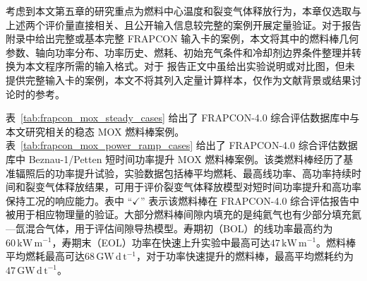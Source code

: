 考虑到本文第五章的研究重点为燃料中心温度和裂变气体释放行为，本章仅选取与上述两个评价量直接相关、且公开输入信息较完整的案例开展定量验证。对于报告附录中给出完整或基本完整 FRAPCON 输入卡的案例，本文将其中的燃料棒几何参数、轴向功率分布、功率历史、燃耗、初始充气条件和冷却剂边界条件整理并转换为本文程序所需的输入格式。对于 报告正文中虽给出实验说明或对比图，但未提供完整输入卡的案例，本文不将其列入定量计算样本，仅作为文献背景或结果讨论时的参考。

表~\ref{tab:frapcon_mox_steady_cases} 给出了 FRAPCON-4.0 综合评估数据库中与本文研究相关的稳态 MOX 燃料棒案例。表~\ref{tab:frapcon_mox_power_ramp_cases} 给出了 FRAPCON-4.0 综合评估数据库中 Beznau-1/Petten 短时间功率提升 MOX 燃料棒案例\cite{ML16118A434}。该类燃料棒经历了基准辐照后的功率提升试验，实验数据包括棒平均燃耗、最高线功率、高功率持续时间和裂变气体释放结果，可用于评价裂变气体释放模型对短时间功率提升和高功率保持工况的响应能力。表中 ``$\checkmark$'' 表示该燃料棒在 FRAPCON-4.0 综合评估报告中被用于相应物理量的验证。大部分燃料棒间隙内填充的是纯氦气也有少部分填充氦—氙混合气体，用于评估间隙导热模型。寿期初（BOL）的线功率最高约为$60\,\mathrm{kW\,m^{-1}}$，寿期末（EOL）功率在快速上升实验中最高可达$47\,\mathrm{kW\,m^{-1}}$。燃料棒平均燃耗最高可达$68\,\mathrm{GW\,d\,t^{-1}}$，对于功率快速提升的燃料棒，最高平均燃耗约为$47\,\mathrm{GW\,d\,t^{-1}}$。

